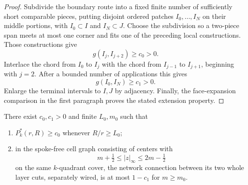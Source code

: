 \begin{proof}
Subdivide the boundary route into a fixed finite number of sufficiently
short comparable pieces, putting disjoint ordered patches
$I_0,\ldots,I_N$ on their middle portions, with $I_0\subset I$
and $I_N\subset J$.  Choose the subdivision so a two-piece span
meets at most one corner and fits one of the preceding local
constructions.  Those constructions give
\begin{equation}\label{sector:skip-chords}
 g(I_j,I_{j+2})\ge c_0>0.
\end{equation}
Interlace the chord from $I_0$ to $I_j$
with the chord from $I_{j-1}$ to $I_{j+1}$, beginning with $j=2$.
After a bounded number of applications this gives
\begin{equation}\label{sector:route-chord}
 g(I_0,I_N)\ge c_1>0.
\end{equation}
Enlarge the terminal intervals to $I,J$ by
adjacency.  Finally, the face-expansion comparison in the first
paragraph proves the stated extension property.
\end{proof}

\begin{lemma}
\label{sector:fixed-geometry}
There exist $c_0,c_1>0$ and finite $L_0,m_0$ such that
\begin{enumerate}[label=\textup{(\roman*)}]
\item $P_k^*(r,R)\geq c_0$ whenever $R/r\geq L_0$;
\item in the spoke-free cell graph consisting of centers with
\[
 m+\tfrac12\leq |z|_\infty\leq2m-\tfrac12
\]
on the same $k$-quadrant cover, the network connection between its two
whole layer cuts, separately wired, is at most $1-c_1$ for $m\geq m_0$.
\end{enumerate}
\end{lemma}

